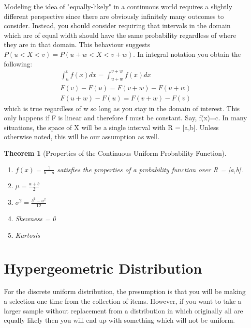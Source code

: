 \documentclass[10pt,]{book}
\theoremstyle{plain}
\newtheorem{theorem}{Theorem}[section]
\theoremstyle{definition}
\theoremstyle{definition}
\theoremstyle{definition}
\numberwithin{equation}{section}
\newcommand{\lt}{ < }
\begin{document}
	Modeling the idea of "equally-likely" in a continuous world requires a slightly different perspective since there are obviously infinitely many outcomes to consider. Instead, you should consider requiring that intervals in the domain which are of equal width should have the same probability regardless of where they are in that domain. This behaviour suggests \(P(u \lt X \lt v) = P(u + w \lt X \lt v + w)\).  In integral notation you obtain the following:
	\begin{gather*}
\int_u^v f(x) dx = \int_{u+w}^{v+w} f(x) dx\\
F(v)-F(u) = F(v+w)-F(u+w)\\
F(u+w)-F(u) = F(v+w)-F(v)
\end{gather*}
	which is true regardless of w so long as you stay in the domain of interest. This only happens if F is linear and therefore f must be constant. Say, f(x)=c. In many situations, the space of X will be a single interval with R = [a,b]. Unless otherwise noted, this will be our assumption as well.
\begin{theorem}[Properties of the Continuous Uniform Probability Function]\label{theorem-32}
\leavevmode%
\begin{enumerate}
\item\hypertarget{li-161}{}\(f(x) = \frac{1}{b-a}\) satisfies the properties of a probability function over R = [a,b].%
\item\hypertarget{li-162}{}\(\mu = \frac{a+b}{2}\)%
\item\hypertarget{li-163}{}\(\sigma^2 = \frac{b^2-a^2}{12}\)%
\item\hypertarget{li-164}{}Skewness = 0%
\item\hypertarget{li-165}{}Kurtosis %
\end{enumerate}
\end{theorem}
\typeout{************************************************}
\typeout{************************************************}
\section[Hypergeometric Distribution]{Hypergeometric Distribution}\label{section-29}

	For the discrete uniform distribution, the presumption is that you will be making a selection one time from the collection of items. However, if you want to take a larger sample without replacement from a distribution in which originally all are equally likely then you will end up with something which will not be uniform.%
\par
\end{document}
